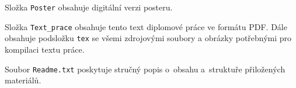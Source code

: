 \documentclass[czech, ing, kiv, he, iso690numb, viewonly]{fasthesis}
\begin{document}
\noindent Složka \texttt{Poster} obsahuje digitální verzi posteru.
\newline

\noindent Složka \texttt{Text\_prace} obsahuje tento text diplomové práce ve formátu PDF. 
Dále obsahuje podsložku \texttt{tex} se všemi zdrojovými soubory a obrázky
potřebnými pro kompilaci textu práce.
\newline

\noindent Soubor \texttt{Readme.txt} poskytuje stručný popis o~obsahu a~struktuře přiložených materiálů.






\backmatter
\printbibliography
\listoffigures
\listoftables
\listoflistings

%
%
\setbackpageqrcode
\backpage
\end{document}
